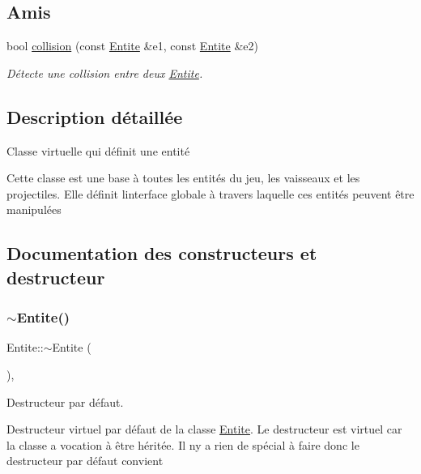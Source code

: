 \subsection*{Amis}
\begin{DoxyCompactItemize}
\item 
bool \hyperlink{class_entite_ac5011435e5099909dd34cd1750933b30}{collision} (const \hyperlink{class_entite}{Entite} \&e1, const \hyperlink{class_entite}{Entite} \&e2)
\begin{DoxyCompactList}\small\item\em Détecte une collision entre deux \hyperlink{class_entite}{Entite}. \end{DoxyCompactList}\end{DoxyCompactItemize}


\subsection{Description détaillée}
Classe virtuelle qui définit une entité 

Cette classe est une base à toutes les entités du jeu, les vaisseaux et les projectiles. Elle définit l\textquotesingle{}interface globale à travers laquelle ces entités peuvent être manipulées 

\subsection{Documentation des constructeurs et destructeur}
\mbox{\label{class_entite_a8084762a25afbfbcdca31121a3dfcd87}} 
\subsubsection{\texorpdfstring{$\sim$\+Entite()}{~Entite()}}
{\footnotesize\ttfamily Entite\+::$\sim$\+Entite (\begin{DoxyParamCaption}{ }\end{DoxyParamCaption})\hspace{0.3cm}{\ttfamily [virtual]}, {\ttfamily [default]}}



Destructeur par défaut. 

Destructeur virtuel par défaut de la classe \hyperlink{class_entite}{Entite}. Le destructeur est virtuel car la classe a vocation à être héritée. Il n\textquotesingle{}y a rien de spécial à faire donc le destructeur par défaut convient 

